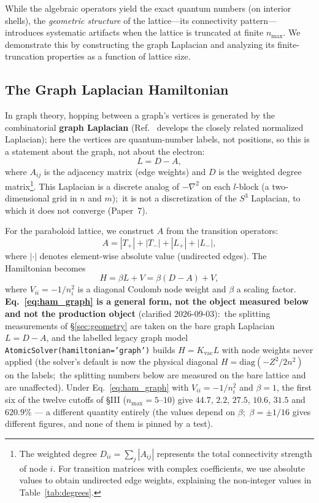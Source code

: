 \documentclass[aps,pra,twocolumn,superscriptaddress,longbibliography]{revtex4-2}
\begin{document}
While the algebraic operators yield the exact quantum numbers (on interior shells), the \textit{geometric structure} of the lattice---its connectivity pattern---introduces systematic artifacts when the lattice is truncated at finite $n_{\max}$. We demonstrate this by constructing the graph Laplacian and analyzing its finite-truncation properties as a function of lattice size.

\subsection{The Graph Laplacian Hamiltonian}

In graph theory, hopping between a graph's vertices is generated by the combinatorial \textbf{graph Laplacian} (Ref.~\cite{chung1997} develops the closely related normalized Laplacian); here the vertices are quantum-number labels, not positions, so this is a statement about the graph, not about the electron:
\begin{equation}
L = D - A,
\label{eq:laplacian}
\end{equation}
where $A_{ij}$ is the adjacency matrix (edge weights) and $D$ is the weighted degree matrix\footnote{The weighted degree $D_{ii} = \sum_j |A_{ij}|$ represents the total connectivity strength of node $i$. For transition matrices with complex coefficients, we use absolute values to obtain undirected edge weights, explaining the non-integer values in Table~\ref{tab:degrees}.}. This Laplacian is a discrete analog of $-\nabla^2$ on each $l$-block (a two-dimensional grid in $n$ and $m$);\ it is not a discretization of the $S^3$ Laplacian, to which it does not converge (Paper~7).

For the paraboloid lattice, we construct $A$ from the transition operators:
\begin{equation}
A = |T_+| + |T_-| + |L_+| + |L_-|,
\end{equation}
where $|\cdot|$ denotes element-wise absolute value (undirected edges). The Hamiltonian becomes
\begin{equation}
H = \beta L + V = \beta (D - A) + V,
\label{eq:ham_graph}
\end{equation}
where $V_{ii} = -1/n_i^2$ is a diagonal Coulomb node weight and $\beta$
a scaling factor.  \textbf{Eq.~\eqref{eq:ham_graph} is a general form, not the
object measured below and not the production object} (clarified 2026-09-03):\
the splitting measurements of \S\ref{sec:geometry} are taken on the bare
graph Laplacian $L = D - A$, and the labelled legacy graph model
\texttt{AtomicSolver(hamiltonian='graph')} builds
$H = K_{\mathrm{vac}} L$ with node weights never applied (the solver's
default is now the physical diagonal $H = \mathrm{diag}(-Z^2/2n^2)$ on
the labels;\ the splitting numbers below are measured on the bare
lattice and are unaffected).  Under
Eq.~\eqref{eq:ham_graph} with $V_{ii} = -1/n_i^2$ and $\beta = 1$, the first six
of the twelve cutoffs of \S III ($n_{\max} = 5$--$10$) give
$44.7$, $2.2$, $27.5$, $10.6$, $31.5$ and $620.9\%$ --- a different
quantity entirely (the values depend on $\beta$;\ $\beta = \pm 1/16$ gives
different figures, and none of them is pinned by a test).
\end{document}
